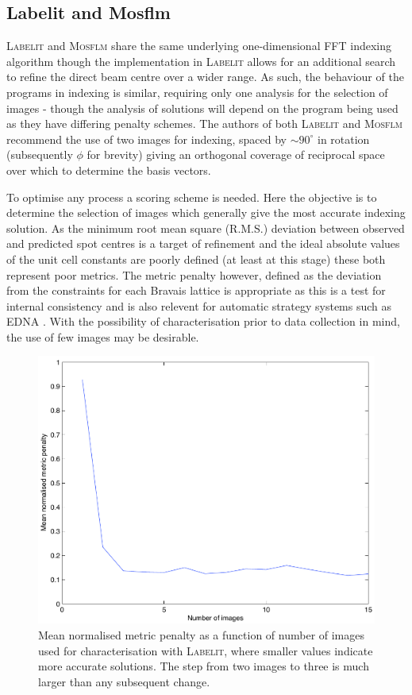 \documentclass[preprint,pdf]{iucr}
\begin{document}
\subsection{Labelit and Mosflm}

\textsc{Labelit} and \textsc{Mosflm} share the same underlying one-dimensional FFT
indexing algorithm \cite{Steller:mf0013} though the
implementation in \textsc{Labelit} allows for an additional search to refine
the direct beam centre over a wider range. As such, the behaviour of
the programs in indexing is similar, requiring only one analysis for
the selection of images - though the analysis of solutions will depend
on the program being used as they have differing penalty schemes.
The authors of both \textsc{Labelit} and \textsc{Mosflm} recommend the use of two images
for indexing, spaced by $\sim 90^{\circ}$ in rotation (subsequently $\phi$ for
brevity) giving an orthogonal coverage of 
reciprocal space over which to determine the basis vectors. 

To optimise any process a scoring scheme is needed. Here the objective
is to determine the selection of images which generally give the most
accurate indexing solution. As the minimum root mean square
(R.M.S.) deviation between observed
and predicted spot centres is a target of refinement and the ideal absolute
values of the unit cell constants are poorly defined (at least at this
stage) these both represent poor metrics. The metric penalty however,
defined as the deviation from the constraints for each Bravais lattice
\cite{Grosse-Kunstleve:sh5006} is appropriate as this is a test for
internal consistency 
and is also relevent for automatic strategy systems such as EDNA
\cite{Incardona:wa5014}. With the possibility of characterisation
prior to data collection in mind, the use of few images may be desirable.

\begin{figure}
\caption{Mean normalised metric penalty as a function of number of
  images used for characterisation with \textsc{Labelit}, where smaller values
  indicate more accurate solutions. The step from two images to three
  is much larger than any subsequent change.
\label{figure:no_images}}
\centering
\includegraphics[scale=0.5]{figures/no_images.pdf}
\end{figure}
\end{document}

